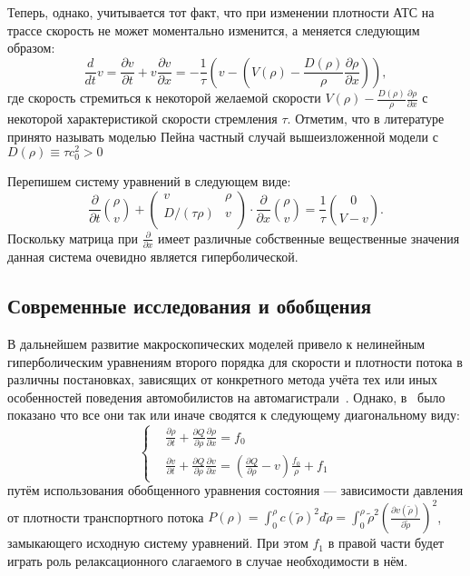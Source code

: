Теперь, однако, учитывается тот факт, что при изменении плотности АТС на трассе скорость не может моментально изменится, а меняется следующим образом:
\[
\frac{d}{dt}v = \frac{\partial v}{\partial t} + v \frac{\partial v}{\partial x} = -\frac{1}{\tau} \left(v - \left(V(\rho) - \frac{D(\rho)}{\rho}\frac{\partial\rho}{\partial x}\right)\right),
\]
где скорость стремиться к некоторой желаемой скорости \( V(\rho) - \frac{D(\rho)}{\rho}\frac{\partial\rho}{\partial x}\) с некоторой характеристикой скорости стремления \(\tau\).
Отметим, что в литературе принято называть моделью Пейна частный случай вышеизложенной модели с \(D(\rho)\equiv\tau c_0^2 > 0\)

Перепишем систему уравнений в следующем виде:
\begin{equation}
    \label{eq:equation5}
  \frac{\partial}{\partial t}\binom{\rho}{v} + 
  \left(
        \begin{array}{cc}
            v  & \rho \\
            D/(\tau\rho)  & v \\
        \end{array}
    \right)\cdot \frac{\partial}{\partial x} \binom{\rho}{v} = \frac{1}{\tau}\binom{0}{V-v}.
\end{equation}
Поскольку матрица при \(\frac{\partial}{\partial x}\) имеет различные собственные вещественные значения данная система очевидно является гиперболической.


\subsection{Современные исследования и обобщения}\label{subsec:ch1/sec1/sub5}
В дальнейшем развитие макроскопических моделей привело к нелинейным гиперболическим уравнениям второго порядка для скорости и плотности потока в различны постановках, зависящих от конкретного метода учёта тех или иных особенностей поведения автомобилистов на автомагистрали~\cite{payne1971model,daganzo1995requiem,papageorgiou1998some,zhang2002non,zhang2003anisotropic,siebel2006fundamental}.
Однако, в~\cite{collectiveArticle} было показано что все они так или иначе сводятся к следующему диагональному виду:
\[
\left\{
\begin{array}{rl}
  &\frac{\partial\rho}{\partial t} + \frac{\partial Q}{\partial\rho}\frac{\partial\rho}{\partial x} = f_0 \\
  &\frac{\partial v}{\partial t} + \frac{\partial Q}{\partial\rho}\frac{\partial v}{\partial x} = (\frac{\partial Q}{\partial\rho} - v) \frac{f_0}{\rho} + f_1
\end{array}
\right.
\]
путём использования обобщенного уравнения состояния --- зависимости давления от плотности транспортного потока \(P(\rho) = \int_{0}^{\rho} c(\tilde{\rho})^2 d\tilde{\rho} = \int_{0}^{\rho} \tilde{\rho}^2 (\frac{\partial v(\tilde{\rho})}{\partial \tilde{\rho}})^2\), 
замыкающего исходную систему уравнений.
При этом \(f_1\) в правой части будет играть роль релаксационного слагаемого в случае необходимости в нём.

